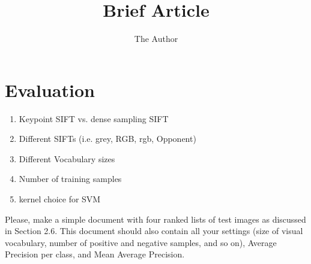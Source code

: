 \documentclass[11pt]{article}
\title{Brief Article}
\author{The Author}
\begin{document}
\maketitle
\section{Evaluation}
\begin{enumerate}
\item Keypoint SIFT vs. dense sampling SIFT
\item Different SIFTs (i.e. grey, RGB, rgb, Opponent)
\item Different Vocabulary sizes
\item Number of training samples
\item kernel choice for SVM
\end{enumerate}

Please, make a simple document with four ranked lists of test images as discussed in Section 2.6. This document should also contain all your settings (size of visual vocabulary, number of positive and negative samples, and so on), Average Precision per class, and Mean Average Precision.
\end{document}
